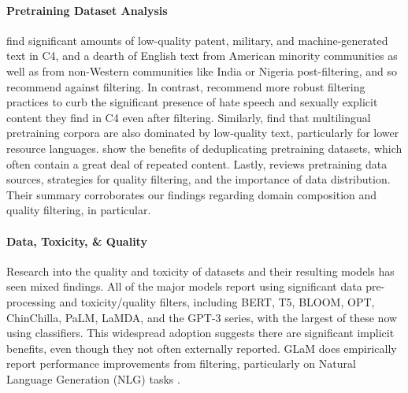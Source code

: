 \documentclass{article}
\begin{document}
\paragraph{Pretraining Dataset Analysis}
\citet{dodge2021documenting} find significant amounts of low-quality patent, military, and machine-generated text in C4, and a dearth of English text from American minority communities as well as from non-Western communities like India or Nigeria post-filtering, and so recommend against filtering.
In contrast, \citet{luccioni2021s} recommend more robust filtering practices to curb the significant presence of hate speech and sexually explicit content they find in C4 even after filtering.
Similarly, \citet{kreutzer2022quality} find that multilingual pretraining corpora are also dominated by low-quality text, particularly for lower resource languages.
\citet{lee2022deduplicating, kaddour2023minipile} show the benefits of deduplicating pretraining datasets, which often contain a great deal of repeated content.
Lastly, \citet{zhao2023survey} reviews pretraining data sources, strategies for quality filtering, and the importance of data distribution. 
Their summary corroborates our findings regarding domain composition and quality filtering, in particular.

\vspace{-3mm}
\paragraph{Data, Toxicity, \& Quality}
\label{sec:rw-tox}
Research into the quality and toxicity of datasets and their resulting models has seen mixed findings. 
All of the major models report using significant data pre-processing and toxicity/quality filters, including BERT, T5, BLOOM, OPT, ChinChilla, PaLM, LaMDA, and the GPT-3 series, with the largest of these now using classifiers.
This widespread adoption suggests there are significant implicit benefits, even though they not often externally reported. GLaM does empirically report performance improvements from filtering, particularly on Natural Language Generation (NLG) tasks \citep{du_glam_2021}.
\end{document}
